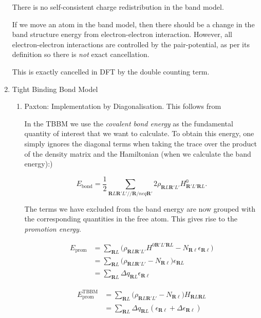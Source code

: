 \documentclass[11pt]{article}
\begin{document}
\begin{enumerate}
There is no self-consistent charge redistribution in the band model.

If we move an atom in the band model, then there should be a change in the band structure energy from electron-electron interaction. 
However, all electron-electron interactions are controlled by the pair-potential, as per its definition so there is \emph{not} exact 
cancellation. 

This is exactly cancelled in DFT by the double counting term. 


\item Tight Binding Bond Model
\label{sec:org81da198}

\begin{enumerate}
\item Paxton: Implementation by Diagonalisation.
\label{sec:orgfc3ee8a}
This follows from \cite{Paxton:153084}

In the TBBM we use the \emph{covalent bond energy} as the fundamental quantity of interest that we want to calculate.
To obtain this energy, one simply ignores the diagonal terms when taking the trace over the product of the density matrix and
the Hamiltonian (when we calculate the band energy):)

\[ 
E_{\text{bond}} = \frac{1}{2} \sum_{\mathbf{R}L\mathbf{R}'L'//\mathbf{R}/neq\mathbf{R}'}
                             2\rho_{\mathbf{R}L\mathbf{R}'L'} H^{0}_{\mathbf{R}'L'\mathbf{R}L}.
\]


The terms we have excluded from the band energy are now grouped with the corresponding quantities in the free atom. 
This gives rise to the \emph{promotion energy}.

\begin{align}
E_{\text{prom}} &= \sum_{\mathbf{R}L} \Big(\rho_{\mathbf{R}L\mathbf{R}'L'}H^{0\mathbf{R}'L'\mathbf{R}L} - N_{\mathbf{R}\ell}\epsilon_{\mathbf{R}\ell} \Big)\\
              &= \sum_{\mathbf{R}L} \Big(\rho_{\mathbf{R}L\mathbf{R}'L'} - N_{\mathbf{R}\ell} \Big) \epsilon_{\mathbf{R}L}\\
              &= \sum_{\mathbf{R}L} \Delta q_{\mathbf{R}L} \epsilon_{\mathbf{R}\ell}
\end{align}

\begin{align}
E_{\text{prom}}^{\text{TBBM}} &= \sum_{\mathbf{R}L} \Big(\rho_{\mathbf{R}L\mathbf{R}'L'} - N_{\mathbf{R}\ell} \Big) H_{\mathbf{R}L\mathbf{R}L}\\
              &= \sum_{\mathbf{R}L} \Delta q_{\mathbf{R}L}( \epsilon_{\mathbf{R}\ell} + \Delta \epsilon_{\mathbf{R}\ell} )
\end{align}


\end{enumerate}
\end{enumerate}
\end{document}
